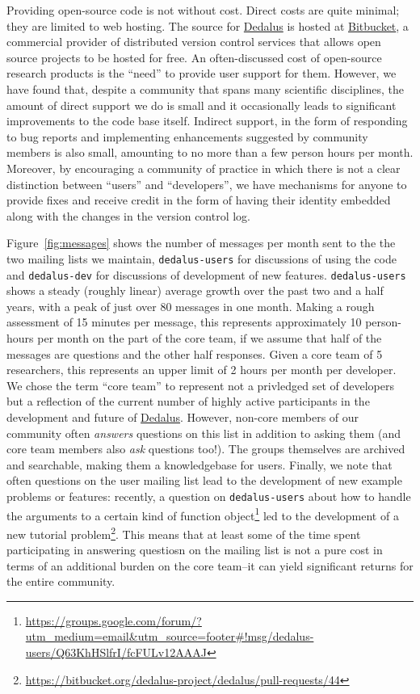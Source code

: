 \documentclass[12pt, titlepage]{aastex62}
\newcommand{\dedalus}{\href{http://dedalus-project.org}{Dedalus}}
\begin{document}
Providing open-source code is not without cost. Direct costs are quite minimal; they are limited to web hosting. The source for \dedalus{} is hosted at \href{https://bitbucket.org}{Bitbucket}, a commercial provider of distributed version control services that allows open source projects to be hosted for free. An often-discussed cost of open-source research products is the ``need'' to provide user support for them. However, we have found that, despite a community that spans many scientific disciplines, the amount of direct support we do is small and it occasionally leads to significant improvements to the code base itself. Indirect support, in the form of responding to bug reports and implementing enhancements suggested by community members is also small, amounting to no more than a few person hours per month. Moreover, by encouraging a community of practice in which there is not a clear distinction between ``users'' and ``developers'', we have mechanisms for anyone to provide fixes and receive credit in the form of having their identity embedded along with the changes in the version control log. 

Figure~\ref{fig:messages} shows the number of messages per month sent to the the two mailing lists we maintain, \texttt{dedalus-users} for discussions of using the code and \texttt{dedalus-dev} for discussions of development of new features. \texttt{dedalus-users} shows a steady (roughly linear) average growth over the past two and a half years, with a peak of just over 80 messages in one month. Making a rough assessment of 15 minutes per message, this represents approximately 10 person-hours per month on the part of the core team, if we assume that half of the messages are questions and the other half responses. Given a core team of 5 researchers, this represents an upper limit of 2 hours per month per developer. We chose the term ``core team'' to represent not a privledged set of developers but a reflection of the current number of highly active participants in the development and future of \dedalus{}. However, non-core members of our community often \emph{answers} questions on this list in addition to asking them (and core team members also \emph{ask} questions too!). The groups themselves are archived and searchable, making them a knowledgebase for users. Finally, we note that often questions on the user mailing list lead to the development of new example problems or features: recently, a question on \texttt{dedalus-users} about how to handle the arguments to a certain kind of function object\footnote{\url{https://groups.google.com/forum/?utm_medium=email&utm_source=footer\#!msg/dedalus-users/Q63KhHSlfrI/fcFULv12AAAJ}} led to the development of a new tutorial problem\footnote{\url{https://bitbucket.org/dedalus-project/dedalus/pull-requests/44}}. This means that at least some of the time spent participating in answering questiosn on the mailing list is not a pure cost in terms of an additional burden on the core team--it can yield significant returns for the entire community.
\end{document}
